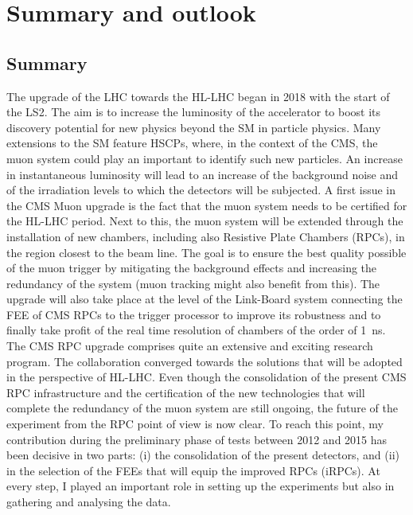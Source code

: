 \renewcommand\evenpagerightmark{{\scshape\small Chapter 7}}
\renewcommand\oddpageleftmark{{\scshape\small Summary and outlook}}

\hyphenation{}

\chapter[Summary and outlooks]{Summary and outlook}
\label{chapt7}

	\section{Summary}
	\label{chapt7:sec:summary}
	
	The upgrade of the \acf{LHC} towards the \acf{HL-LHC} began in 2018 with the start of the \acf{LS2}. The aim is to increase the luminosity of the accelerator to boost its discovery potential for new physics beyond the \acf{SM} in particle physics. Many extensions to the SM feature \acf{HSCPs}, where, in the context of the \acf{CMS}, the muon system could play an important to identify such new particles. An increase in instantaneous luminosity will lead to an increase of the background noise and of the irradiation levels to which the detectors will be subjected. A first issue in the CMS Muon upgrade is the fact that the muon system needs to be certified for the HL-LHC period. Next to this, the muon system will be extended through the installation of new chambers, including also Resistive Plate Chambers (RPCs), in the region closest to the beam line. The goal is to ensure the best quality possible of the muon trigger by mitigating the background effects and increasing the redundancy of the system (muon tracking might also benefit from this). The upgrade will also take place at the level of the Link-Board system connecting the \acf{FEE} of CMS RPCs to the trigger processor to improve its robustness and to finally take profit of the real time resolution of chambers of the order of \SI{1}{ns}. The CMS RPC upgrade comprises quite an extensive and exciting research program. The collaboration converged towards the solutions that will be adopted in the perspective of HL-LHC. Even though the consolidation of the present CMS RPC infrastructure and the certification of the new technologies that will complete the redundancy of the muon system are still ongoing, the future of the experiment from the RPC point of view is now clear. To reach this point, my contribution during the preliminary phase of tests between 2012 and 2015 has been decisive in two parts: (i) the consolidation of the present detectors, and (ii) in the selection of the FEEs that will equip the improved RPCs (iRPCs). At every step, I played an important role in setting up the experiments but also in gathering and analysing the data.
	
